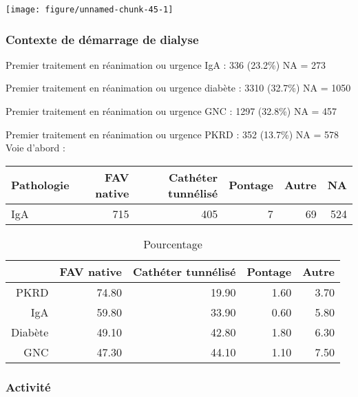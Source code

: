 \documentclass[11pt,a4paper]{article}\usepackage[]{graphicx}\usepackage[]{color}
\makeatletter
\def\maxwidth{ %
  \ifdim\Gin@nat@width>\linewidth
    \linewidth
  \else
    \Gin@nat@width
  \fi
}
\makeatother
\begin{document}
\texttt{[image: figure/unnamed-chunk-45-1]} 


    \subsubsection{Contexte de démarrage de dialyse}



    
Premier traitement en réanimation ou urgence IgA :  336 (23.2\%) NA = 273

Premier traitement en réanimation ou urgence diabète :  3310 (32.7\%) NA = 1050

Premier traitement en réanimation ou urgence GNC :  1297 (32.8\%) NA = 457

Premier traitement en réanimation ou urgence PKRD :  352 (13.7\%) NA = 578
~\\

Voie d’abord :
\begin{table}[ht]
\centering
\begin{tabular}{lrrrrr}
  \hline
Pathologie & FAV native & Cathéter tunnélisé & Pontage & Autre & NA \\ 
  \hline
IgA & 715 & 405 &   7 &  69 & 524 \\ 
   \hline
\end{tabular}
\end{table}
\begin{table}[ht]
\centering
\begin{tabular}{rrrrr}
  \hline
 & FAV native & Cathéter tunnélisé & Pontage & Autre \\ 
  \hline
PKRD & 74.80 & 19.90 & 1.60 & 3.70 \\ 
  IgA & 59.80 & 33.90 & 0.60 & 5.80 \\ 
  Diabète & 49.10 & 42.80 & 1.80 & 6.30 \\ 
  GNC & 47.30 & 44.10 & 1.10 & 7.50 \\ 
   \hline
\end{tabular}
\caption{Pourcentage} 
\end{table}


    \subsubsection{Activité}
\end{document}
